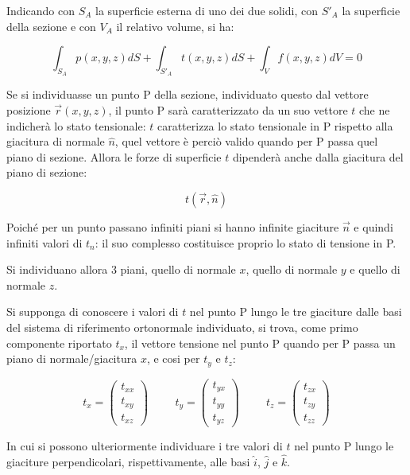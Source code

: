 \documentclass{article}
\begin{document}
\begin{adjustwidth}{2in}{}
	Indicando con $ S_A $ la superficie esterna di uno dei due
	solidi, con $ S'_A $ la superficie della sezione e con $ V_A $ il
	relativo volume, si ha:
	
	\[ \int_{S_A}p(x,y,z)dS + \int_{S'_A}t(x,y,z)dS + \int_{V}f(x,y,z)dV = 0  \]
		
	Se si individuasse un punto P della sezione, individuato  questo dal vettore
	posizione $\vec{r}(x,y,z)$, il punto P sarà caratterizzato da un suo vettore $t$ che ne indicherà lo stato tensionale: $t$ caratterizza lo stato tensionale in P rispetto alla giacitura di normale $\hat{n}$, quel vettore è perciò valido quando per P passa quel piano di sezione. Allora le forze di
	superficie $ t $ dipenderà anche dalla giacitura
	del piano di sezione:
	
	\[ t(\vec{r}, \hat{n})\]
	
	Poiché per un punto passano infiniti piani si hanno infinite giaciture $\vec{n}$ e quindi infiniti valori di $ t_n $: il suo complesso costituisce proprio lo stato di tensione in P. \newline
	
	Si individuano allora 3 piani, quello di normale $x$, quello di normale $y$ e quello di normale $z$. 
	
	Si supponga di conoscere i valori di $ t $ nel punto P lungo le tre giaciture
	dalle basi del sistema di riferimento ortonormale individuato, si trova, come primo componente riportato $t_x$, il vettore tensione nel punto P quando per P passa un piano di normale/giacitura $x$, e cosi per $t_y$ e $t_z$:
	
	\[
	t_x = \left( \begin{array}{c}
		t_{xx} \\
		t_{xy} \\
		t_{xz}
	\end{array}\right)  \hspace{1cm} 	t_y =\left(  \begin{array}{c}
		t_{yx} \\
		t_{yy} \\
		t_{yz}
	\end{array}\right)  \hspace{1cm} t_z = \left( \begin{array}{c}
		t_{zx} \\
		t_{zy} \\
		t_{zz}
	\end{array}\right) 
	\]
	
	In cui si possono ulteriormente individuare i tre valori di $ t $ nel punto P lungo le giaciture perpendicolari, rispettivamente, alle basi
	$\hat{i}$, $\hat{j}$ e $\hat{k}$.
	

\end{adjustwidth}
\end{document}
